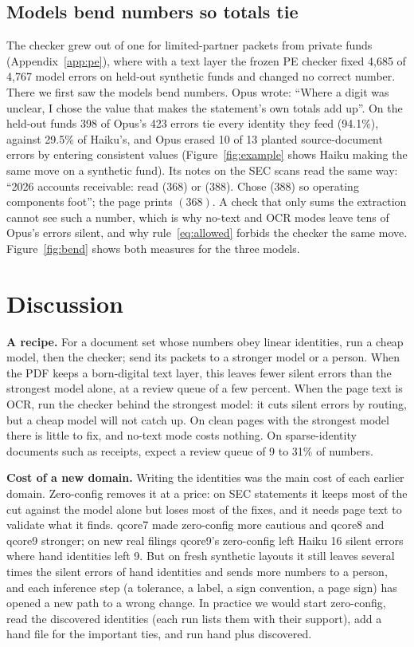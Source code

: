 \documentclass[10pt,twocolumn]{article}
\newcommand{\vq}[1]{\textsf{qcore#1}}
\begin{document}
\subsection{Models bend numbers so totals tie}\label{sec:bend}
The checker grew out of one for limited-partner packets from private funds (Appendix~\ref{app:pe}), where with a text layer the frozen PE checker fixed 4,685 of 4,767 model errors on held-out synthetic funds and changed no correct number. There we first saw the models bend numbers. Opus wrote: ``Where a digit was unclear, I chose the value that makes the statement's own totals add up''. On the held-out funds 398 of Opus's 423 errors tie every identity they feed (94.1\%), against 29.5\% of Haiku's, and Opus erased 10 of 13 planted source-document errors by entering consistent values (Figure~\ref{fig:example} shows Haiku making the same move on a synthetic fund). Its notes on the SEC scans read the same way: ``2026 accounts receivable: read (368) or (388). Chose (388) so operating components foot''; the page prints $(368)$. A check that only sums the extraction cannot see such a number, which is why no-text and OCR modes leave tens of Opus's errors silent, and why rule~\eqref{eq:allowed} forbids the checker the same move. Figure~\ref{fig:bend} shows both measures for the three models.




\section{Discussion}

\textbf{A recipe.} For a document set whose numbers obey linear identities, run a cheap model, then the checker; send its packets to a stronger model or a person. When the PDF keeps a born-digital text layer, this leaves fewer silent errors than the strongest model alone, at a review queue of a few percent. When the page text is OCR, run the checker behind the strongest model: it cuts silent errors by routing, but a cheap model will not catch up. On clean pages with the strongest model there is little to fix, and no-text mode costs nothing. On sparse-identity documents such as receipts, expect a review queue of 9 to 31\% of numbers.

\textbf{Cost of a new domain.} Writing the identities was the main cost of each earlier domain. Zero-config removes it at a price: on SEC statements it keeps most of the cut against the model alone but loses most of the fixes, and it needs page text to validate what it finds. \vq{7} made zero-config more cautious and \vq{8} and \vq{9} stronger; on new real filings \vq{9}'s zero-config left Haiku 16 silent errors where hand identities left 9. But on fresh synthetic layouts it still leaves several times the silent errors of hand identities and sends more numbers to a person, and each inference step (a tolerance, a label, a sign convention, a page sign) has opened a new path to a wrong change. In practice we would start zero-config, read the discovered identities (each run lists them with their support), add a hand file for the important ties, and run hand plus discovered.
\end{document}
